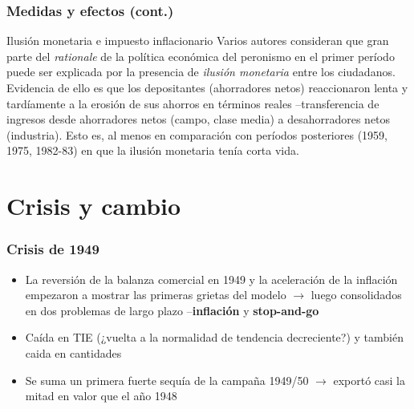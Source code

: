 \documentclass[14pt,aspectratio=169]{beamer}
\begin{document}
                               \begin{frame}\frametitle{Medidas y efectos (cont.)}
                                 \begin{block}{Ilusión monetaria e
                                     impuesto inflacionario}
                                   Varios autores consideran que gran
                                   parte del \textit{rationale} de la
                                   política económica del peronismo en
                                   el primer período puede ser
                                   explicada por la presencia de
                                   \textit{ilusión monetaria} entre
                                   los ciudadanos. Evidencia de ello
                                   es que los depositantes
                                   (ahorradores netos) reaccionaron
                                   lenta y tardíamente a la erosión
                                   de sus ahorros en términos reales
                                   --transferencia de ingresos desde
                                   ahorradores netos (campo, clase media) a desahorradores
                                   netos (industria). Esto es, al
                                   menos en comparación con períodos
                                   posteriores (1959, 1975, 1982-83) en que la ilusión
                                   monetaria tenía corta vida. 
                                   \end{block}
               \end{frame}
      
      

 \section{Crisis y cambio}

 \begin{frame}\frametitle{Crisis de 1949}
  \begin{itemize}\itemsep 10pt
      \item La reversión de la balanza comercial en 1949 y la
        aceleración de la inflación empezaron a mostrar las primeras
        grietas del modelo $\longrightarrow$ luego consolidados en dos
        problemas de largo plazo --\textbf{inflación} y
        \textbf{stop-and-go}
        \item Caída en TIE (¿vuelta a la normalidad de tendencia
          decreciente?) y también caida en cantidades
          \item Se suma un primera fuerte sequía de la campaña 1949/50
            $\longrightarrow$ exportó casi la mitad en valor que el
            año 1948
                 \end{itemize}
               \end{frame}
\end{document}
